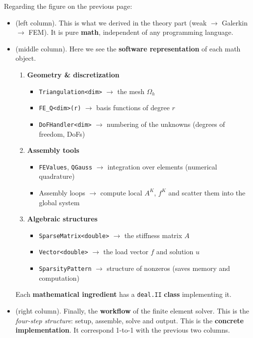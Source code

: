 \noindent
Regarding the figure on the previous page:
\begin{itemize}
    \item {} (left column). This is what we derived in the theory part (weak $\rightarrow$ Galerkin $\rightarrow$ FEM). It is pure \textbf{math}, independent of any programming language.
    
    \item {} (middle column). Here we see the \textbf{software representation} of each math object.
    \begin{enumerate}
        \item \textbf{Geometry \& discretization}
        \begin{itemize}
            \item \texttt{Triangulation<dim>} $\rightarrow$ the mesh $\Omega_h$
            \item \texttt{FE\_Q<dim>(r)} $\rightarrow$ basis functions of degree $r$
            \item \texttt{DoFHandler<dim>} $\rightarrow$ numbering of the unknowns (degrees of freedom, DoFs)
        \end{itemize}
        \item \textbf{Assembly tools}
        \begin{itemize}
            \item \texttt{FEValues}, \texttt{QGauss} $\rightarrow$ integration over elements (numerical qua\-drature)
            \item Assembly loops $\rightarrow$ compute local $A^K$, $f^K$ and scatter them into the global system
        \end{itemize}
        \item \textbf{Algebraic structures}
        \begin{itemize}
            \item \texttt{SparseMatrix<double>} $\rightarrow$ the stiffness matrix $A$
            \item \texttt{Vector<double>} $\rightarrow$ the load vector $f$ and solution $u$
            \item \texttt{SparsityPattern} $\rightarrow$ structure of nonzeros (saves memory and computation)
        \end{itemize}
    \end{enumerate}
    Each \textbf{mathematical ingredient} has a \texttt{deal.II} \textbf{class} implementing it.
    
    \item {} (right column). Finally, the \textbf{workflow} of the finite element solver. This is the \emph{four-step structure}: setup, assemble, solve and output. This is the \textbf{concrete implementation}. It correspond 1-to-1 with the previous two columns.
\end{itemize}